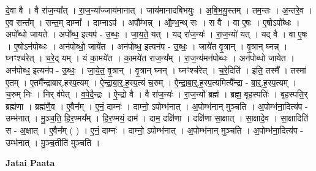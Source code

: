\documentclass[17pt]{extarticle}
\begin{document}
दे॒वा वै । वै रा॑ज॒न्या᳚त् । रा॒ज॒न्या᳚ज्जाय॑मानात् । जाय॑मानादबिभयुः । अ॒बि॒भ॒यु॒स्तम् । तम॒न्तः । अ॒न्तरे॒व । ए॒व सन्त᳚म् । सन्त॒म् दाम्ना᳚ । दाम्नाऽप॑ । अपौ᳚म्भन्न् । औ॒म्भ॒न्थ् सः । स वै । वा ए॒षः । ए॒षोऽपो᳚ब्धः । अपो᳚ब्धो जायते । अपो᳚ब्ध॒ इत्यप॑ - उ॒ब्धः॒ । जा॒य॒ते॒ यत् । यद् रा॑ज॒न्यः॑ । रा॒ज॒न्यो॑ यत् । यद् वै । वा ए॒षः । ए॒षोऽन॑पोब्धः । अन॑पोब्धो॒ जाये॑त । अन॑पोब्ध॒ इत्यन॑प - उ॒ब्धः॒ । जाये॑त वृ॒त्रान् । वृ॒त्रान् घ्नन्न् । घ्नꣳश्च॑रेत् । च॒रे॒द् यम् । यं का॒मये॑त । का॒मये॑त राज॒न्य᳚म् । रा॒ज॒न्य॑मन॑पोब्धः । अन॑पोब्धो जायेत । अन॑पोब्ध॒ इत्यन॑प - उ॒ब्धः॒ । जा॒ये॒त॒ वृ॒त्रान् । वृ॒त्रान् घ्नन् । घ्नꣳश्च॑रेत् । च॒रे॒दिति॑ । इति॒ तस्मै᳚ । तस्मा॑ ए॒तम् । ए॒तमै᳚न्द्राबार्.हस्प॒त्यम् । ऐ॒न्द्रा॒बा॒र्॒.ह॒स्प॒त्यं च॒रुम् । ऐ॒न्द्रा॒बा॒र्॒.ह॒स्प॒त्यमित्यै᳚न्द्रा - बा॒र्॒.ह॒स्प॒त्यम् । च॒रुम् निः । निर् व॑पेत् । व॒पे॒दै॒न्द्रः । ऐ॒न्द्रो वै । वै रा॑ज॒न्यः॑ । रा॒ज॒न्यो᳚ ब्रह्म॑ । ब्रह्म॒ बृह॒स्पतिः॑ । बृह॒स्पति॒र् ब्रह्म॑णा । ब्रह्म॑णै॒व । ए॒वैन᳚म् । ए॒नं॒ दाम्नः॑ । दाम्नो॒ ऽपोम्भ॑नात् । अ॒पोम्भ॑नान् मुञ्चति । अ॒पोम्भ॑ना॒दित्य॑प - उम्भ॑नात् । मु॒ञ्च॒ति॒ हि॒र॒ण्मय᳚म् । हि॒र॒ण्मयं॒ दाम॑ । दाम॒ दक्षि॑णा । दक्षि॑णा सा॒क्षात् । सा॒क्षादे॒व । सा॒क्षादिति॑ स - अ॒क्षात् । ए॒वैन᳚म् ( ) । ए॒नं॒ दाम्नः॑ । दाम्नो॒ ऽपोम्भ॑नात् । अ॒पोम्भ॑नान् मुञ्चति । अ॒पोम्भ॑ना॒दित्य॑प - उम्भ॑नात् । 
मु॒ञ्च॒तीति॑ मुञ्चति । \newline

\textbf{Jatai Paata} \newline
\end{document}
